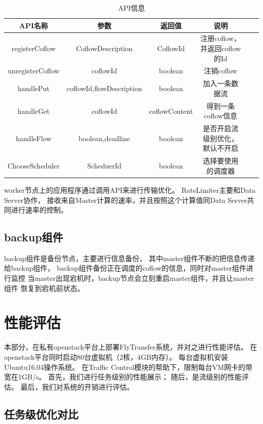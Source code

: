  
 \begin{table}[h]
\centering
\footnotesize
 \caption{API信息} \label{Master:API}
\begin{tabular}{|c|c|c|c|c|c|} \hline
\toprule
API名称  &参数&返回值&说明 \\
\toprule
registerCoflow&CoflowDescription&CoflowId&注册coflow，并返回coflow的Id\\
\toprule
unregisterCoflow&coflowId&boolean&注销coflow\\
\toprule
handlePut&coflowId,flowDescription&boolean&加入一条数据流\\
\toprule
handleGet&coflowId&coflowContent&得到一条coflow信息\\
\toprule
handleFlow&boolean,deadline&boolean&是否开启流级别优化，默认不开启\\
\toprule
ChooseScheduler&ScheduerId&boolean&选择要使用的调度器\\
\toprule
\end{tabular}
\end{table}
worker节点上的应用程序通过调用API来进行传输优化。
RateLimiter主要和Data Server协作，
接收来自Master计算的速率，并且按照这个计算值同Data Server共同进行速率的控制。


 \subsection{backup组件}
 backup组件是备份节点，主要进行信息备份，
 其中master组件不断的把信息传递给backup组件，
 backup组件备份正在调度的coflow的信息，同时对master组件进行监控
 当master出现宕机时，backup节点会立刻重启master组件，并且让master组件
 恢复到宕机前状态。
 
 \section{性能评估}
本部分，在私有openstack平台上部署FlyTransfer系统，并对之进行性能评估。
在openstack平台同时启动80台虚拟机（2核，4GB内存）。
每台虚拟机安装Ubuntu16.04操作系统。
在Traffic Control模块\cite{TC}的帮助下，限制每台VM网卡的带宽在1GB/s。
首先，我们进行任务级别的性能展示；
随后，是流级别的性能评估。
最后，我们对系统的开销进行评估。

 \subsection{任务级优化对比}

